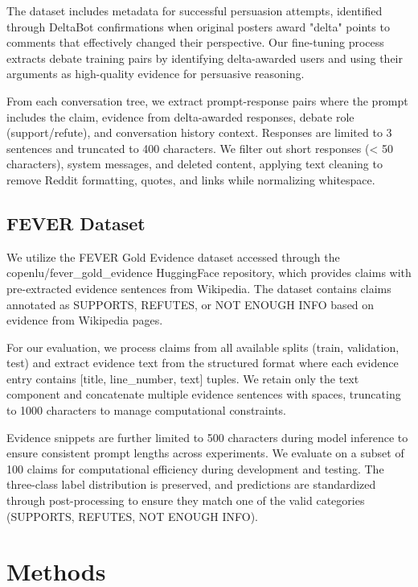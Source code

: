 \documentclass[11pt]{article}
\begin{document}
The dataset includes metadata for successful persuasion attempts, identified through DeltaBot confirmations when original posters award "delta" points to comments that effectively changed their perspective. Our fine-tuning process extracts debate training pairs by identifying delta-awarded users and using their arguments as high-quality evidence for persuasive reasoning.

From each conversation tree, we extract prompt-response pairs where the prompt includes the claim, evidence from delta-awarded responses, debate role (support/refute), and conversation history context. Responses are limited to 3 sentences and truncated to 400 characters. We filter out short responses (< 50 characters), system messages, and deleted content, applying text cleaning to remove Reddit formatting, quotes, and links while normalizing whitespace.

\subsection{FEVER Dataset}

We utilize the FEVER Gold Evidence dataset \cite{FEVER} accessed through the copenlu/fever\_gold\_evidence \cite{atanasova2020generating} HuggingFace repository, which provides claims with pre-extracted evidence sentences from Wikipedia. The dataset contains claims annotated as SUPPORTS, REFUTES, or NOT ENOUGH INFO based on evidence from Wikipedia pages.

For our evaluation, we process claims from all available splits (train, validation, test) and extract evidence text from the structured format where each evidence entry contains [title, line\_number, text] tuples. We retain only the text component and concatenate multiple evidence sentences with spaces, truncating to 1000 characters to manage computational constraints.

Evidence snippets are further limited to 500 characters during model inference to ensure consistent prompt lengths across experiments. We evaluate on a subset of 100 claims for computational efficiency during development and testing. The three-class label distribution is preserved, and predictions are standardized through post-processing to ensure they match one of the valid categories (SUPPORTS, REFUTES, NOT ENOUGH INFO).


\section{Methods}
\end{document}
